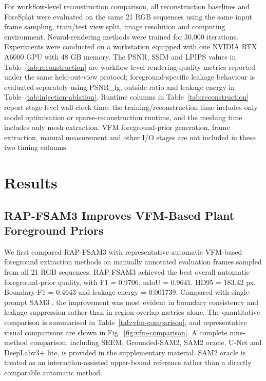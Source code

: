 \documentclass[a4paper]{cas-sc}
\begin{document}
For workflow-level reconstruction comparison, all reconstruction baselines and ForeSplat were evaluated on the same 21 RGB sequences using the same input frame sampling, train/test view split, image resolution and computing environment. Neural-rendering methods were trained for 30,000 iterations. Experiments were conducted on a workstation equipped with one NVIDIA RTX A6000 GPU with 48 GB memory. The PSNR, SSIM and LPIPS values in Table~\ref{tab:reconstruction} are workflow-level rendering-quality metrics reported under the same held-out-view protocol; foreground-specific leakage behaviour is evaluated separately using PSNR\_fg, outside ratio and leakage energy in Table~\ref{tab:injection-ablation}. Runtime columns in Table~\ref{tab:reconstruction} report stage-level wall-clock time: the training/reconstruction time includes only model optimisation or sparse-reconstruction runtime, and the meshing time includes only mesh extraction. VFM foreground-prior generation, frame extraction, manual measurement and other I/O stages are not included in these two timing columns.

\section{Results}\label{sec:results}

\subsection{RAP-FSAM3 Improves VFM-Based Plant Foreground Priors}\label{sec:vfm-baseline-results}

We first compared RAP-FSAM3 with representative automatic VFM-based foreground extraction methods on manually annotated evaluation frames sampled from all 21 RGB sequences. RAP-FSAM3 achieved the best overall automatic foreground-prior quality, with F1 = 0.9706, mIoU = 0.9641, HD95 = 183.42 px, Boundary-F1 = 0.4643 and leakage energy = 0.001739. Compared with single-prompt SAM3 \cite{ref71}, the improvement was most evident in boundary consistency and leakage suppression rather than in region-overlap metrics alone. The quantitative comparison is summarised in Table~\ref{tab:vfm-comparison}, and representative visual comparisons are shown in Fig.~\ref{fig:vfm-comparison}. A complete nine-method comparison, including SEEM, Grounded-SAM2, SAM2 oracle, U-Net and DeepLabv3+ lite, is provided in the supplementary material. SAM2 oracle is treated as an interaction-assisted upper-bound reference rather than a directly comparable automatic method.
\end{document}
